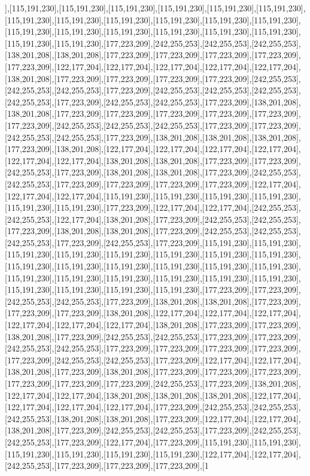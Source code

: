 ],[115,191,230],[115,191,230],[115,191,230],[115,191,230],[115,191,230],[115,191,230],[115,191,230],[115,191,230],[115,191,230],[115,191,230],[115,191,230],[115,191,230],[115,191,230],[115,191,230],[115,191,230],[115,191,230],[115,191,230],[115,191,230],[115,191,230],[115,191,230],[177,223,209],[242,255,253],[242,255,253],[242,255,253],[138,201,208],[138,201,208],[177,223,209],[177,223,209],[177,223,209],[177,223,209],[177,223,209],[122,177,204],[122,177,204],[122,177,204],[122,177,204],[122,177,204],[138,201,208],[177,223,209],[177,223,209],[177,223,209],[177,223,209],[242,255,253],[242,255,253],[242,255,253],[177,223,209],[242,255,253],[242,255,253],[242,255,253],[242,255,253],[177,223,209],[242,255,253],[242,255,253],[177,223,209],[138,201,208],[138,201,208],[177,223,209],[177,223,209],[177,223,209],[177,223,209],[177,223,209],[177,223,209],[242,255,253],[242,255,253],[242,255,253],[177,223,209],[177,223,209],[242,255,253],[242,255,253],[177,223,209],[138,201,208],[138,201,208],[138,201,208],[177,223,209],[138,201,208],[122,177,204],[122,177,204],[122,177,204],[122,177,204],[122,177,204],[122,177,204],[138,201,208],[138,201,208],[177,223,209],[177,223,209],[242,255,253],[177,223,209],[138,201,208],[138,201,208],[177,223,209],[242,255,253],[242,255,253],[177,223,209],[177,223,209],[177,223,209],[177,223,209],[122,177,204],[122,177,204],[122,177,204],[115,191,230],[115,191,230],[115,191,230],[115,191,230],[115,191,230],[115,191,230],[177,223,209],[122,177,204],[122,177,204],[242,255,253],[242,255,253],[122,177,204],[138,201,208],[177,223,209],[242,255,253],[242,255,253],[177,223,209],[138,201,208],[138,201,208],[177,223,209],[242,255,253],[242,255,253],[242,255,253],[177,223,209],[242,255,253],[177,223,209],[115,191,230],[115,191,230],[115,191,230],[115,191,230],[115,191,230],[115,191,230],[115,191,230],[115,191,230],[115,191,230],[115,191,230],[115,191,230],[115,191,230],[115,191,230],[115,191,230],[115,191,230],[115,191,230],[115,191,230],[115,191,230],[115,191,230],[115,191,230],[115,191,230],[115,191,230],[115,191,230],[115,191,230],[177,223,209],[177,223,209],[242,255,253],[242,255,253],[177,223,209],[138,201,208],[138,201,208],[177,223,209],[177,223,209],[177,223,209],[138,201,208],[122,177,204],[122,177,204],[122,177,204],[122,177,204],[122,177,204],[122,177,204],[138,201,208],[177,223,209],[177,223,209],[138,201,208],[177,223,209],[242,255,253],[242,255,253],[177,223,209],[177,223,209],[242,255,253],[242,255,253],[177,223,209],[177,223,209],[177,223,209],[177,223,209],[177,223,209],[242,255,253],[242,255,253],[177,223,209],[122,177,204],[122,177,204],[138,201,208],[177,223,209],[138,201,208],[177,223,209],[177,223,209],[177,223,209],[177,223,209],[177,223,209],[177,223,209],[242,255,253],[177,223,209],[138,201,208],[122,177,204],[122,177,204],[138,201,208],[138,201,208],[138,201,208],[122,177,204],[122,177,204],[122,177,204],[122,177,204],[177,223,209],[242,255,253],[242,255,253],[242,255,253],[138,201,208],[138,201,208],[177,223,209],[122,177,204],[122,177,204],[138,201,208],[177,223,209],[242,255,253],[242,255,253],[177,223,209],[242,255,253],[242,255,253],[177,223,209],[122,177,204],[177,223,209],[115,191,230],[115,191,230],[115,191,230],[115,191,230],[115,191,230],[115,191,230],[122,177,204],[122,177,204],[242,255,253],[177,223,209],[177,223,209],[177,223,209],[1